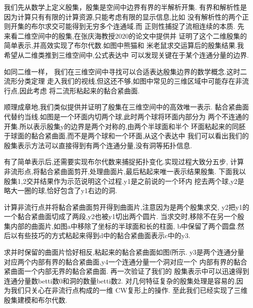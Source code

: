 \documentclass[UTF8]{ctexbeamer}	%
\theoremstyle{plain}
\theoremstyle{definition}
\theoremstyle{remark}
\numberwithin{equation}{section}
\begin{document}
\begin{frame}
  我们先从数学上定义殷集，殷集是空间中边界有界的半解析开集.
  有界和解析性是因为计算只有有限的计算资源,只能考虑有限的显示信息,比如
  没有解析性的两个正则开集的布尔求交可能得到无穷多个连通域.而
  正则性捕捉了流相连续的本质.
  先来看二维空间中的殷集,在张庆海教授2020的论文中提供并
  证明了这个二维殷集的简单表示,并高效实现了布尔代数.如图中熊猫和
  米老鼠求交运算后的殷集结果.我希望从二维类推到三维空间中,公式表达中
  可以发现关键在于某个连通分量的边界.
\end{frame}

\begin{frame}
  如同二维一样，
  我们在三维空间中寻找可以合适表达殷集边界的数学概念.这时二流形分类定理
  走入我们的视线,但这还不够,如图中常见的三维区域中可能存在非流行点,因此考虑
  将二流形粘起来的黏合紧曲面.
\end{frame}

\begin{frame}
  顺理成章地,我们类似提供并证明了殷集在三维空间中的高效唯一表示.
  黏合紧曲面代替约当线.如图是一个环面内切两个球,此时两个球将环面内部分为
  两个不连通的开集.所以表示殷集y的边界是两个对称的,由两个半球面和半个
  环面粘起来的同胚于球面的黏合紧曲面,而不是两个球和一个环面,从这个表达中
  我们可以看出我们的殷集表示方法可以直接得到有两个连通分量,没有洞等拓扑信息.
\end{frame}

\begin{frame}
  有了简单表示后,还需要实现布尔代数来捕捉拓扑变化.实现过程大致分五步,
  计算非流形点,将黏合紧曲面剪开,处理曲面片,最后粘起来唯一表示结果殷集.
  下面我以殷集1,2交并结果作为示范说明这个过程.y1是之前说的一个环内
  挖去两个球,y2是略大一圈的球,恰好包含了y1右边的洞.
\end{frame}

\begin{frame}
  计算非流行点并将黏合紧曲面剪开得到曲面片,注意因为是两个殷集求交,
  y2把y1的一个黏合紧曲面切成了两段,y2也被y1切出两个圆片.
  当求交时,移除不在另一个殷集内部的曲面片,如图a中移除了坐标的半球面和长的柱面,
  b中保留了两个圆盘.然后以有些技巧的方式粘起来得到d中的黏合紧曲面表示c中的y3.
\end{frame}

\begin{frame}
  求并时保留的曲面片恰好相反,粘起来的黏合紧曲面如图f所示.
  y3是两个连通分量对应两个内部有界的黏合紧曲面,y4一个连通分量一个洞对应一个
  内部有界的黏合紧曲面一个内部无界的黏合紧曲面.
  再一次验证了我们的
  殷集表示中可以迅速得到连通分量数betti数0和洞的数量betti数2.
  对几何特征复杂的殷集处理是容易的,因为我们只关心在非流行点构成的一维
  CW复形上的操作.
  至此我们已经实现了三维殷集建模和布尔代数.
\end{frame}
\end{document}
